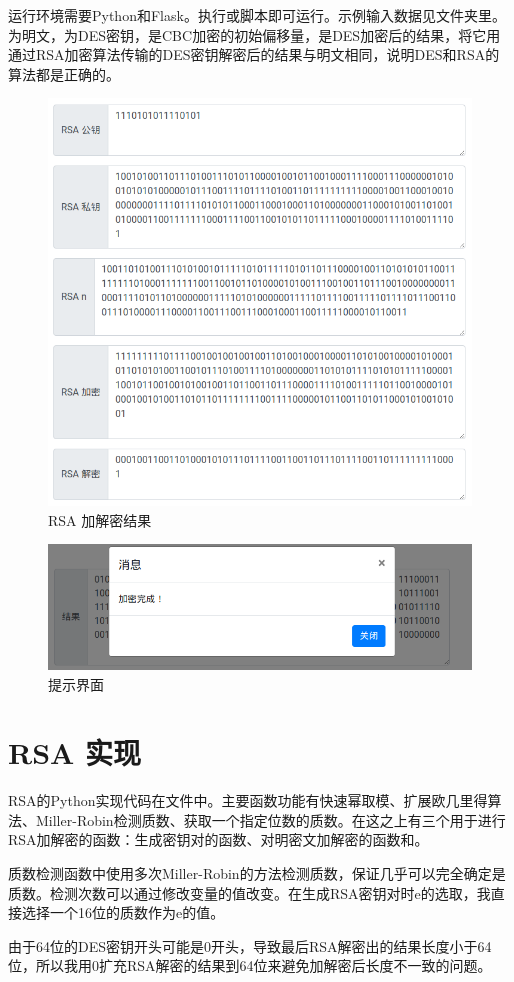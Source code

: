\documentclass[12pt,a4paper]{article}
\begin{document}
运行环境需要Python和Flask。执行或脚本即可运行。示例输入数据见文件夹里。为明文，为DES密钥，是CBC加密的初始偏移量，是DES加密后的结果，将它用通过RSA加密算法传输的DES密钥解密后的结果与明文相同，说明DES和RSA的算法都是正确的。


\begin{figure}[htbp]
	\centering
	\includegraphics[width=\textwidth]{rsa}
	\caption{RSA 加解密结果}
	\label{fig:rsa}
\end{figure}

\begin{figure}[htbp]
	\centering
	\includegraphics[width=\textwidth]{result}
	\caption{提示界面}
	\label{fig:result}
\end{figure}

\section{RSA 实现}

RSA的Python实现代码在文件中。主要函数功能有快速幂取模、扩展欧几里得算法、Miller-Robin检测质数、获取一个指定位数的质数。在这之上有三个用于进行RSA加解密的函数：生成密钥对的函数、对明密文加解密的函数和。

质数检测函数中使用多次Miller-Robin的方法检测质数，保证几乎可以完全确定是质数。检测次数可以通过修改变量的值改变。在生成RSA密钥对时e的选取，我直接选择一个16位的质数作为e的值。

由于64位的DES密钥开头可能是0开头，导致最后RSA解密出的结果长度小于64位，所以我用0扩充RSA解密的结果到64位来避免加解密后长度不一致的问题。
\end{document}
